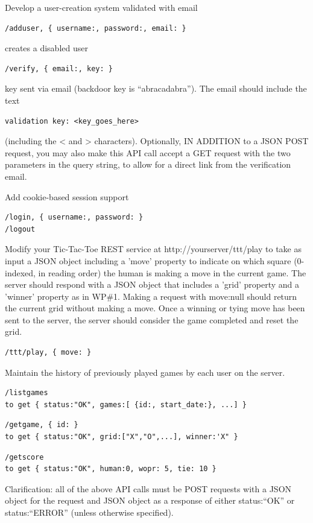 \documentclass[fancy,11pt,titlestyle=display]{style/elegantbook}
\begin{document}
\begin{problemset}
\item Develop a user-creation system validated with email
\begin{lstlisting}
/adduser, { username:, password:, email: }
\end{lstlisting}
creates a disabled user

\begin{lstlisting}
/verify, { email:, key: }
\end{lstlisting}
key sent via email (backdoor key is ``abracadabra''). The email should include the text 
\begin{lstlisting}
validation key: <key_goes_here>
\end{lstlisting}
(including the < and > characters). Optionally, IN ADDITION to a JSON POST request, you may also make this API call accept a GET request with the two parameters in the query string, to allow for a direct link from the verification email.

\item Add cookie-based session support
\begin{lstlisting}
/login, { username:, password: }
/logout
\end{lstlisting}
\item Modify your Tic-Tac-Toe REST service at http://yourserver/ttt/play to take as input a JSON object including a 'move' property to indicate on which square (0-indexed, in reading order) the human is making a move in the current game. The server should respond with a JSON object that includes a 'grid' property and a 'winner' property as in WP\#1. Making a request with { move:null } should return the current grid without making a move. Once a winning or tying move has been sent to the server, the server should consider the game completed and reset the grid.
\begin{lstlisting}
/ttt/play, { move: }
\end{lstlisting}
\item Maintain the history of previously played games by each user on the server.
\begin{lstlisting}
/listgames
to get { status:"OK", games:[ {id:, start_date:}, ...] }
\end{lstlisting}

\begin{lstlisting}
/getgame, { id: }
to get { status:"OK", grid:["X","O",...], winner:'X" }
\end{lstlisting}

\begin{lstlisting}
/getscore
to get { status:"OK", human:0, wopr: 5, tie: 10 }
\end{lstlisting}

Clarification: all of the above API calls must be POST requests with a JSON object for the request and JSON object as a response of either { status:``OK'' } or { status:``ERROR'' } (unless otherwise specified).
\end{problemset}
\clearpage
\end{document}
